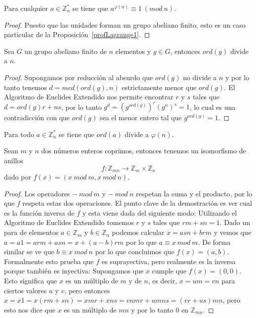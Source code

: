 \begin{theorem}[de Euler]
Para cualquier $a \in {\mathbb Z}_n^*$ se tiene que $a^{\varphi(n)} \equiv 1 ~(mod~n)$.
\end{theorem}
\begin{proof}
Puesto que las unidades forman un grupo abeliano finito, esto es un caso particular
de la Proposici\'on~\ref{profLagrange1}.
\end{proof}

\begin{proposition}
Sea $G$ un grupo abeliano finito de $n$ elementos y $g \in G$, entonces $ord(g)$ divide a $n$.
\end{proposition}
\begin{proof}
Supongamos por reducci\'on al absurdo que $ord(g)$ no divide a $n$ y por lo tanto tenemos $d = mcd(ord(g),n)$ estrictamente menor que $ord(g)$.
El Algoritmo de Euclides Extendido nos permite encontrar $r$ y $s$ tales que $d = ord(g)r+ns$, por lo tanto $g^d = (g^{ord(g)})^r(g^n)^s = 1$, lo cual es una contradicci\'on con
que $ord(g)$ sea el menor entero tal que $g^{ord(g)} = 1$.
\end{proof}

\begin{corollary}
Para todo $a \in {\mathbb Z}_n^*$ se tiene que $ord(a)$ divide a $\varphi(n)$.
\end{corollary}

\begin{theorem} Sean $m$ y $n$ dos n\'umeros enteros
coprimos, entonces tenemos un isomorfismo de anillos
\[ f : {\mathbb Z}_{mn} \to {\mathbb Z}_m \times {\mathbb Z}_n \] dado por
$f(x) = (x~mod~m, x~mod~n)$.
\end{theorem}
\begin{proof}
Los operadores $-~mod~m$ y $-~mod~n$ respetan la suma y el producto, por lo que
$f$ respeta estas dos operaciones. El punto clave de la demostraci\'on es ver cual es
la funci\'on inversa de $f$ y esta viene dada del siguiente modo: Utilizando el Algoritmo
de Euclides Extendido tomemos $r$ y $s$ tales que $rm+sn =1$. Dado un para de elementos
$a \in {\mathbb Z}_m$ y $b \in {\mathbb Z}_n$ podemos calcular $x = asn+brm$ y vemos que
$a = a1 = arm+asn = x + (a-b)rm$ por lo que $a \equiv x~mod~m$. De forma similar se ve
que $b \equiv x~mod~n$ por lo que concluimos que $f(x) = (a,b)$. Formalmente esto prueba que
$f$ es suprayectiva, pero realmente es la inversa porque tambi\'en es inyectiva: Supongamos
que $x$ cumple que $f(x) = (0,0)$. Esto significa que $x$ es un m\'ultiplo de $m$ y de $n$, es
decir, $x = um = vn$ para ciertos valores $u$ y $v$, pero entonces $x = x1 = x(rm+sn) =
xmr + xns = vnmr+umns = (vr+us)mn$, pero esto nos dice que $x$ es un m\'ultiplo de $mn$ y
por lo tanto $0$ en ${\mathbb Z}_{mn}$.
\end{proof}

